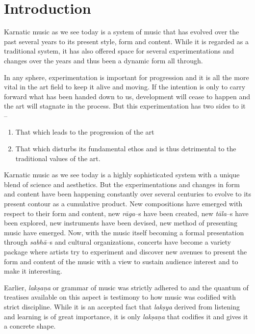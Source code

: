 \section*{Introduction}

Karnatic music as we see today is a system of music that has evolved over the past several years to its present style, form and content. While it is regarded as a traditional system, it has also offered space for several experimentations and changes over the years and thus been a dynamic form all through.

In any sphere, experimentation is important for progression and it is all the more vital in the art field to keep it alive and moving. If the intention is only to carry forward what has been handed down to us, development will cease to happen and the art will stagnate in the process. But this experimentation has two sides to it –

\vspace{-.3cm}

\begin{enumerate}
\itemsep=0pt
\item That which leads to the progression of the art

 \item That which disturbs its fundamental ethos and is thus detrimental to the traditional values of the art.

\end{enumerate}

\vspace{-.3cm}

Karnatic music as we see today is a highly sophisticated system with a unique blend of science and aesthetics. But the experimentations and changes in form and content have been happening constantly over several centuries to evolve to its present contour as a cumulative product. New compositions have emerged with respect to their form and content, new \textit{rāga}–s have been created, new \textit{tāla}–s have been explored, new instruments have been devised, new method of presenting music have emerged. Now, with the music itself becoming a formal presentation through \textit{sabhā}–s and cultural organizations, concerts have become a variety package where artists try to experiment and discover new avenues to present the form and content of the music with a view to sustain audience interest and to make it interesting.

Earlier, \textit{lakṣaṇa} or grammar of music was strictly adhered to and the quantum of treatises available on this aspect is testimony to how music was codified with strict discipline. While it is an accepted fact that \textit{lakṣya} derived from listening and learning is of great importance, it is only \textit{lakṣaṇa} that codifies it and gives it a concrete shape.

